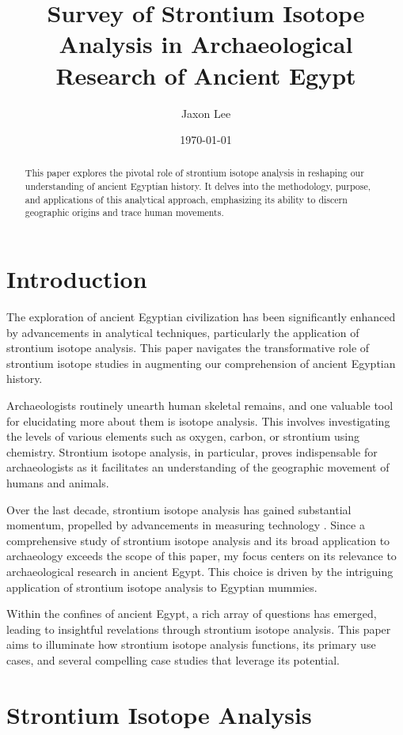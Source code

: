 \documentclass[a4paper, 12pt]{article}
\title{Survey of Strontium Isotope Analysis in Archaeological Research of Ancient Egypt}
\author{Jaxon Lee}
\date{\today}
\begin{document}
\maketitle

\begin{abstract}
    This paper explores the pivotal role of strontium isotope analysis in
    reshaping our understanding of ancient Egyptian history. It delves into
    the methodology, purpose, and applications of this analytical approach,
    emphasizing its ability to discern geographic origins and trace human movements.
\end{abstract}

\section{Introduction}
The exploration of ancient Egyptian civilization has been significantly enhanced by
advancements in analytical techniques, particularly the application of strontium
isotope analysis. This paper navigates the transformative role of strontium isotope
studies in augmenting our comprehension of ancient Egyptian history.

Archaeologists routinely unearth human skeletal remains, and one valuable tool for
elucidating more about them is isotope analysis. This involves investigating the
levels of various elements such as oxygen, carbon, or strontium using chemistry.
Strontium isotope analysis, in particular, proves indispensable for archaeologists
as it facilitates an understanding of the geographic movement of humans and animals.

Over the last decade, strontium isotope analysis has gained substantial momentum,
propelled by advancements in measuring technology \citep{holt2021}. Since a
comprehensive study of strontium isotope analysis and its broad application to archaeology
exceeds the scope of this paper, my focus centers on its relevance to archaeological
research in ancient Egypt. This choice is driven by the intriguing application of
strontium isotope analysis to Egyptian mummies.

Within the confines of ancient Egypt, a rich array of questions has emerged, leading
to insightful revelations through strontium isotope analysis. This paper aims to
illuminate how strontium isotope analysis functions, its primary use cases, and several
compelling case studies that leverage its potential.

\section{Strontium Isotope Analysis}
\end{document}
